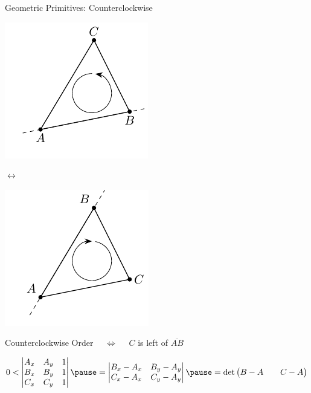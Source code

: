 \documentclass[aspectratio=169]{beamer}
\begin{document}
  \begin{frame}{Geometric Primitives: Counterclockwise}
    \begin{minipage}[c]{0.4\textwidth}
        \centering
        \includegraphics{figures/triangle-counterclockwise.pdf}
    \end{minipage}
    \hfill
    $\longleftrightarrow$
    \hfill
    \begin{minipage}[c]{0.4\textwidth}
        \centering
        \includegraphics{figures/triangle-clockwise.pdf}
    \end{minipage}

    Counterclockwise Order
    \pause
    $\quad\iff\quad$ $C$ is left of $\overline{AB}$

    \bigskip

    \pause
    \begin{mybox}
    \[
      0 <
      \begin{vmatrix}
        A_x & A_y & 1 \\
        B_x & B_y & 1 \\
        C_x & C_y & 1 \\
      \end{vmatrix}
      \pause
      =
      \begin{vmatrix}
        B_x - A_x & B_y - A_y \\
        C_x - A_x & C_y - A_y \\
      \end{vmatrix}
      \pause
      =
      \det
      \begin{pmatrix}
        B-A && C-A
      \end{pmatrix}
    \]
    \end{mybox}
  \end{frame}
\end{document}
